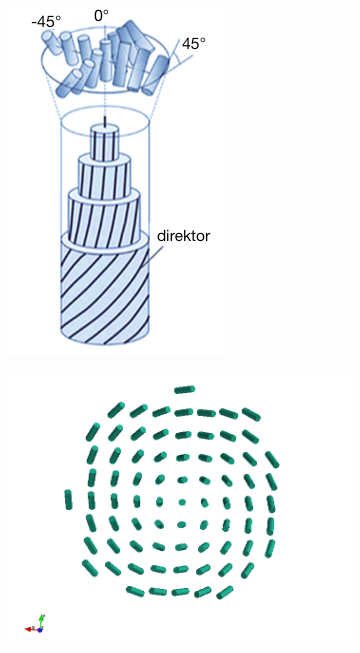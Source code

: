 \documentclass[longbibliography,slovene,a4paper,12pt]{book}
\begin{document}
\begin{figure}[h!]
	\centering
	\begin{subfigure}[b]{0.4\textwidth}
	\includegraphics[width=\textwidth]{slike/double_twist_cylinder.png}
	\label{fig:dtc}
	\end{subfigure}
	\begin{subfigure}[b]{0.5\textwidth}
	\includegraphics[width=\textwidth]{slike/dtc_z.png}

\end{subfigure}
\end{figure}
\end{document}
